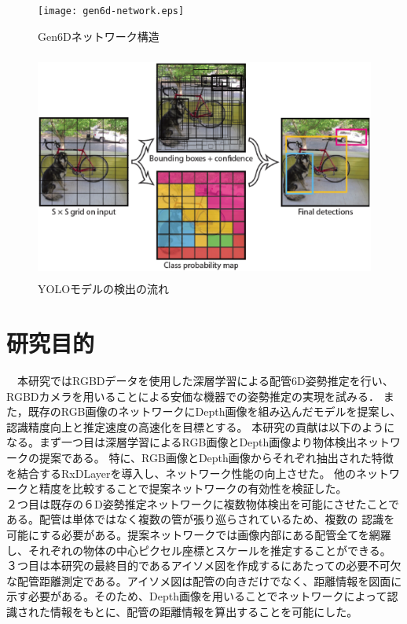 \begin{figure}[htbt]
	\centering
	 \texttt{[image: gen6d-network.eps]}
	 \caption{Gen6Dネットワーク構造}
	 \label{fig:f2}
\end{figure}

\begin{figure}[htbt]
	\centering
	 \includegraphics[height=75mm]{yolo.eps}
	 \caption{YOLOモデルの検出の流れ}
	 \label{fig:f2}
\end{figure}

\section{研究目的}
　本研究ではRGBDデータを使用した深層学習による配管6D姿勢推定を行い、RGBDカメラを用いることによる安価な機器での姿勢推定の実現を試みる．
また，既存のRGB画像のネットワークにDepth画像を組み込んだモデルを提案し、認識精度向上と推定速度の高速化を目標とする。
本研究の貢献は以下のようになる。まず一つ目は深層学習によるRGB画像とDepth画像より物体検出ネットワークの提案である。
特に、RGB画像とDepth画像からそれぞれ抽出された特徴を結合するRxDLayerを導入し、ネットワーク性能の向上させた。
他のネットワークと精度を比較することで提案ネットワークの有効性を検証した。\\
２つ目は既存の６D姿勢推定ネットワークに複数物体検出を可能にさせたことである。配管は単体ではなく複数の管が張り巡らされているため、複数の
認識を可能にする必要がある。提案ネットワークでは画像内部にある配管全てを網羅し、それぞれの物体の中心ピクセル座標とスケールを推定することができる。
３つ目は本研究の最終目的であるアイソメ図を作成するにあたっての必要不可欠な配管距離測定である。アイソメ図は配管の向きだけでなく、距離情報を図面に
示す必要がある。そのため、Depth画像を用いることでネットワークによって認識された情報をもとに、配管の距離情報を算出することを可能にした。

